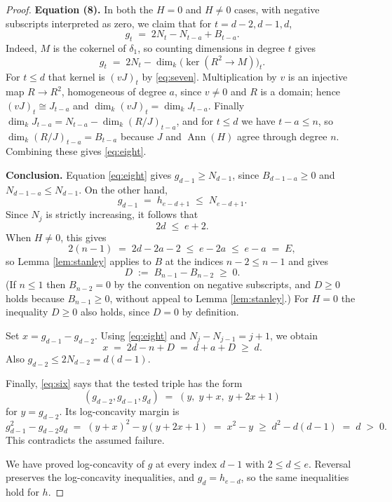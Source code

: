\documentclass[11pt]{article}
\theoremstyle{remark}
\newcommand{\Ann}{\operatorname{Ann}}
\begin{document}
\begin{proof}
\medskip
\noindent\textbf{Equation (8).}
In both the $H = 0$ and $H \ne 0$ cases, with negative subscripts
interpreted as zero, we claim that for $t = d-2, d-1, d$,
\begin{equation} \label{eq:eight}
  g_t \;=\; 2N_t - N_{t-a} + B_{t-a} .
\end{equation}
Indeed, $M$ is the cokernel of $\delta_1$, so counting dimensions in degree
$t$ gives
\[
  g_t \;=\; 2N_t - \dim_k \bigl( \ker(R^2 \to M) \bigr)_t .
\]
For $t \le d$ that kernel is $(vJ)_t$ by \eqref{eq:seven}. Multiplication by
$v$ is an injective map $R \to R^2$, homogeneous of degree $a$, since $v \ne
0$ and $R$ is a domain; hence $(vJ)_t \cong J_{t-a}$ and
$\dim_k (vJ)_t = \dim_k J_{t-a}$. Finally
$\dim_k J_{t-a} = N_{t-a} - \dim_k (R/J)_{t-a}$, and for $t \le d$ we have
$t - a \le n$, so $\dim_k (R/J)_{t-a} = B_{t-a}$ because $J$ and $\Ann(H)$
agree through degree $n$. Combining these gives \eqref{eq:eight}.

\medskip
\noindent\textbf{Conclusion.}
Equation \eqref{eq:eight} gives $g_{d-1} \ge N_{d-1}$, since
$B_{d-1-a} \ge 0$ and $N_{d-1-a} \le N_{d-1}$. On the other hand,
\[
  g_{d-1} \;=\; h_{e-d+1} \;\le\; N_{e-d+1} .
\]
Since $N_j$ is strictly increasing, it follows that
\begin{equation} \label{eq:nine}
  2d \;\le\; e + 2 .
\end{equation}
When $H \ne 0$, this gives
\[
  2(n-1) \;=\; 2d - 2a - 2 \;\le\; e - 2a \;\le\; e - a \;=\; E,
\]
so Lemma \ref{lem:stanley} applies to $B$ at the indices $n-2 \le n-1$ and
gives
\[
  D \;:=\; B_{n-1} - B_{n-2} \;\ge\; 0 .
\]
(If $n \le 1$ then $B_{n-2} = 0$ by the convention on negative subscripts,
and $D \ge 0$ holds because $B_{n-1} \ge 0$, without appeal to Lemma
\ref{lem:stanley}.) For $H = 0$ the inequality $D \ge 0$ also holds, since
$D = 0$ by definition.

Set $x = g_{d-1} - g_{d-2}$. Using \eqref{eq:eight} and
$N_j - N_{j-1} = j+1$, we obtain
\[
  x \;=\; 2d - n + D \;=\; d + a + D \;\ge\; d .
\]
Also $g_{d-2} \le 2N_{d-2} = d(d-1)$.

Finally, \eqref{eq:six} says that the tested triple has the form
\[
  (g_{d-2}, g_{d-1}, g_d) \;=\; (y,\; y+x,\; y+2x+1)
\]
for $y = g_{d-2}$. Its log-concavity margin is
\[
  g_{d-1}^2 - g_{d-2} g_d
  \;=\; (y+x)^2 - y(y + 2x + 1)
  \;=\; x^2 - y
  \;\ge\; d^2 - d(d-1) \;=\; d \;>\; 0 .
\]
This contradicts the assumed failure.

We have proved log-concavity of $g$ at every index $d-1$ with
$2 \le d \le e$. Reversal preserves the log-concavity inequalities, and
$g_d = h_{e-d}$, so the same inequalities hold for $h$.
\end{proof}
\end{document}

